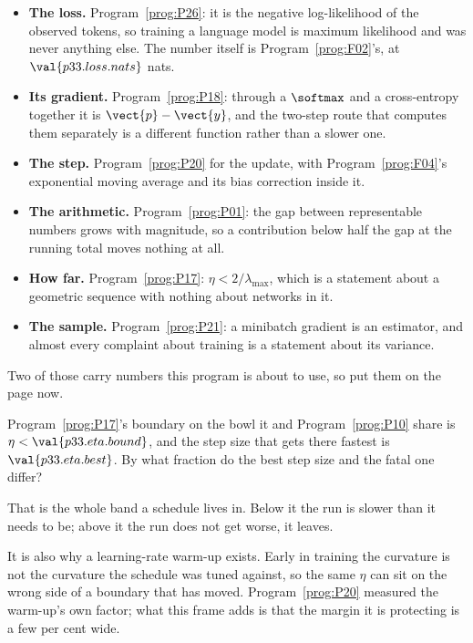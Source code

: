 \begin{fr}
\begin{ansblock}
\begin{itemize}
\item \textbf{The loss.} Program~\ref{prog:P26}: it is the negative
  log-likelihood of the observed tokens, so training a language model is
  maximum likelihood and was never anything else. The number itself is
  Program~\ref{prog:F02}'s, at $\val{p33.loss.nats}$ nats.
\item \textbf{Its gradient.} Program~\ref{prog:P18}: through a $\softmax$ and
  a cross-entropy together it is $\vect{p} - \vect{y}$, and the two-step route
  that computes them separately is a different function rather than a slower
  one.
\item \textbf{The step.} Program~\ref{prog:P20} for the update, with
  Program~\ref{prog:F04}'s exponential moving average and its bias correction
  inside it.
\item \textbf{The arithmetic.} Program~\ref{prog:P01}: the gap between
  representable numbers grows with magnitude, so a contribution below half
  the gap at the running total moves nothing at all.
\item \textbf{How far.} Program~\ref{prog:P17}:
  $\eta < 2/\lambda_{\max}$, which is a statement about a geometric sequence
  with nothing about networks in it.
\item \textbf{The sample.} Program~\ref{prog:P21}: a minibatch gradient is an
  estimator, and almost every complaint about training is a statement about
  its variance.
\end{itemize}
\end{ansblock}
\end{fr}


\begin{fr}
Two of those carry numbers this program is about to use, so put them on the
page now.

Program~\ref{prog:P17}'s boundary on the bowl it and Program~\ref{prog:P10}
share is $\eta < \val{p33.eta.bound}$, and the step size that gets there
fastest is $\val{p33.eta.best}$. By what fraction do the best step size and
the fatal one differ?
\dotline
\nextframe
\end{fr}

\begin{fr}
That is the whole band a schedule lives in. Below it the run is slower than
it needs to be; above it the run does not get worse, it leaves.

\begin{aibox}
It is also why a learning-rate warm-up exists. Early in training the curvature
is not the curvature the schedule was tuned against, so the same $\eta$ can
sit on the wrong side of a boundary that has moved. Program~\ref{prog:P20}
measured the warm-up's own factor; what this frame adds is that the margin it
is protecting is a few per cent wide.
\end{aibox}
\end{fr}

